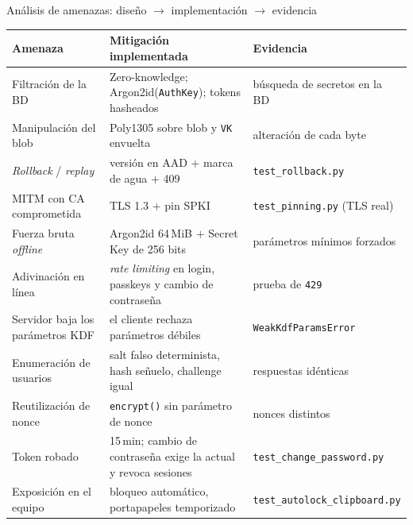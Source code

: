 \documentclass[aspectratio=169,10pt]{beamer}
\newcommand{\key}[1]{\textcolor{cripto}{\texttt{#1}}}
\newcommand{\code}[1]{\texttt{\footnotesize #1}}
\begin{document}
\begin{frame}{Análisis de amenazas: diseño $\to$ implementación $\to$ evidencia}
  \centering\scriptsize
  \renewcommand{\arraystretch}{0.95}
  \begin{tabular}{@{}p{} p{} p{}@{}}
    \toprule
    \textbf{Amenaza} & \textbf{Mitigación implementada} & \textbf{Evidencia} \\
    \midrule
    Filtración de la BD & Zero-knowledge; Argon2id(\key{AuthKey}); tokens hasheados & búsqueda de secretos en la BD \\
    Manipulación del blob & Poly1305 sobre blob y \key{VK} envuelta & alteración de cada byte \\
    \emph{Rollback} / \emph{replay} & versión en AAD $+$ marca de agua $+$ 409 & \texttt{test\_rollback.py} \\
    MITM con CA comprometida & TLS 1.3 $+$ pin SPKI & \texttt{test\_pinning.py} (TLS real) \\
    Fuerza bruta \emph{offline} & Argon2id 64\,MiB $+$ Secret Key de 256 bits & parámetros mínimos forzados \\
    Adivinación en línea & \emph{rate limiting} en login, passkeys y cambio de contraseña & prueba de \texttt{429} \\
    Servidor baja los parámetros KDF & el cliente rechaza parámetros débiles & \texttt{WeakKdfParamsError} \\
    Enumeración de usuarios & salt falso determinista, hash señuelo, challenge igual & respuestas idénticas \\
    Reutilización de nonce & \code{encrypt()} sin parámetro de nonce & nonces distintos \\
    Token robado & 15\,min; cambio de contraseña exige la actual y revoca sesiones & \texttt{test\_change\_password.py} \\
    Exposición en el equipo & bloqueo automático, portapapeles temporizado & \texttt{test\_autolock\_clipboard.py} \\
    \bottomrule
  \end{tabular}
\end{frame}
\end{document}
